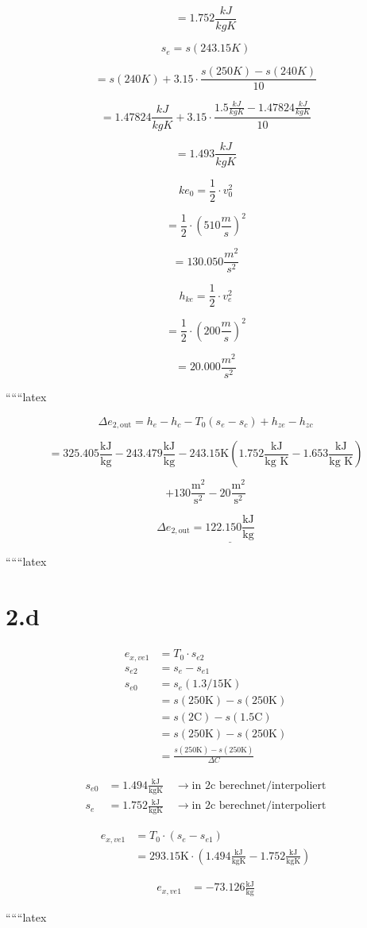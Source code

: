 \[
= 1.752 \frac{kJ}{kgK}
\]

\[
s_e = s(243.15K)
\]

\[
= s(240K) + 3.15 \cdot \frac{s(250K) - s(240K)}{10}
\]

\[
= 1.47824 \frac{kJ}{kgK} + 3.15 \cdot \frac{1.5 \frac{kJ}{kgK} - 1.47824 \frac{kJ}{kgK}}{10}
\]

\[
= 1.493 \frac{kJ}{kgK}
\]

\[
ke_0 = \frac{1}{2} \cdot v_0^2
\]

\[
= \frac{1}{2} \cdot (510 \frac{m}{s})^2
\]

\[
= 130.050 \frac{m^2}{s^2}
\]

\[
h_{ke} = \frac{1}{2} \cdot v_e^2
\]

\[
= \frac{1}{2} \cdot (200 \frac{m}{s})^2
\]

\[
= 20.000 \frac{m^2}{s^2}
\]

``````latex


\[
\Delta e_{2, \text{out}} = h_e - h_c - T_0 (s_e - s_c) + h_{ze} - h_{zc}
\]

\[
= 325.405 \frac{\text{kJ}}{\text{kg}} - 243.479 \frac{\text{kJ}}{\text{kg}} - 243.15 \text{K} \left(1.752 \frac{\text{kJ}}{\text{kg K}} - 1.653 \frac{\text{kJ}}{\text{kg K}}\right)
\]

\[
+ 130 \frac{\text{m}^2}{\text{s}^2} - 20 \frac{\text{m}^2}{\text{s}^2}
\]

\[
\Delta e_{2, \text{out}} = \underline{122.150 \frac{\text{kJ}}{\text{kg}}}
\]

``````latex


\section*{2.d}

\begin{align*}
e_{x,ve1} &= T_0 \cdot s_{e2} \\
s_{e2} &= s_{e} - s_{e1} \\
s_{e0} &= s_{e}(1.3/15\text{K}) \\
&= s(250\text{K}) - s(250\text{K}) \\
&= s(2\text{C}) - s(1.5\text{C}) \\
&= s(250\text{K}) - s(250\text{K}) \\
&= \frac{s(250\text{K}) - s(250\text{K})}{\Delta C}
\end{align*}

\begin{align*}
s_{e0} &= 1.494 \frac{\text{kJ}}{\text{kgK}} \quad \rightarrow \text{in 2c berechnet/interpoliert} \\
s_{e} &= 1.752 \frac{\text{kJ}}{\text{kgK}} \quad \rightarrow \text{in 2c berechnet/interpoliert}
\end{align*}

\begin{align*}
e_{x,ve1} &= T_0 \cdot (s_{e} - s_{e1}) \\
&= 293.15\text{K} \cdot (1.494 \frac{\text{kJ}}{\text{kgK}} - 1.752 \frac{\text{kJ}}{\text{kgK}})
\end{align*}

\begin{align*}
e_{x,ve1} &= -73.126 \frac{\text{kJ}}{\text{kg}}
\end{align*}

``````latex


